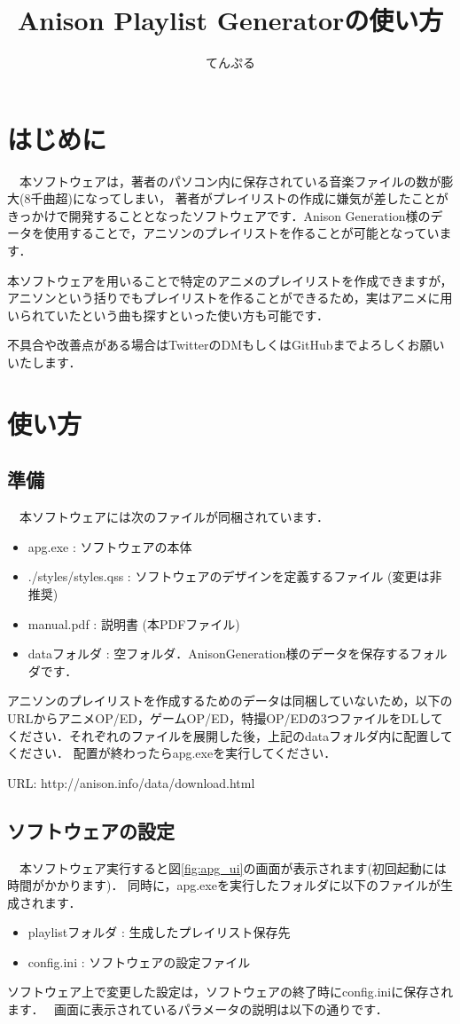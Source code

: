 \documentclass[10pt]{ujarticle}
\title{Anison Playlist Generatorの使い方}
\author{てんぷる}
\begin{document}
\maketitle
\tableofcontents

\newpage 

\section{はじめに}
　本ソフトウェアは，著者のパソコン内に保存されている音楽ファイルの数が膨大(8千曲超)になってしまい，
著者がプレイリストの作成に嫌気が差したことがきっかけで開発することとなったソフトウェアです．Anison Generation様のデータを使用することで，アニソンのプレイリストを作ることが可能となっています．
\par 本ソフトウェアを用いることで特定のアニメのプレイリストを作成できますが，アニソンという括りでもプレイリストを作ることができるため，実はアニメに用いられていたという曲も探すといった使い方も可能です．
\par 不具合や改善点がある場合はTwitterのDMもしくはGitHubまでよろしくお願いいたします．
　
\section{使い方}
\subsection{準備}
　本ソフトウェアには次のファイルが同梱されています．
\begin{itemize}
    \item apg.exe : ソフトウェアの本体
    \item ./styles/styles.qss : ソフトウェアのデザインを定義するファイル (変更は非推奨)
    \item manual.pdf : 説明書 (本PDFファイル)
    \item dataフォルダ : 空フォルダ．AnisonGeneration様のデータを保存するフォルダです．
\end{itemize}
アニソンのプレイリストを作成するためのデータは同梱していないため，以下のURLからアニメOP/ED，ゲームOP/ED，特撮OP/EDの3つファイルをDLしてください．それぞれのファイルを展開した後，上記のdataフォルダ内に配置してください．
配置が終わったらapg.exeを実行してください．
\par URL: http://anison.info/data/download.html

\subsection{ソフトウェアの設定}
　本ソフトウェア実行すると図\ref{fig:apg_ui}の画面が表示されます(初回起動には時間がかかります)．
同時に，apg.exeを実行したフォルダに以下のファイルが生成されます．
\begin{itemize}
    \item playlistフォルダ : 生成したプレイリスト保存先
    \item config.ini : ソフトウェアの設定ファイル
\end{itemize}
ソフトウェア上で変更した設定は，ソフトウェアの終了時にconfig.iniに保存されます．　
画面に表示されているパラメータの説明は以下の通りです．
\end{document}
